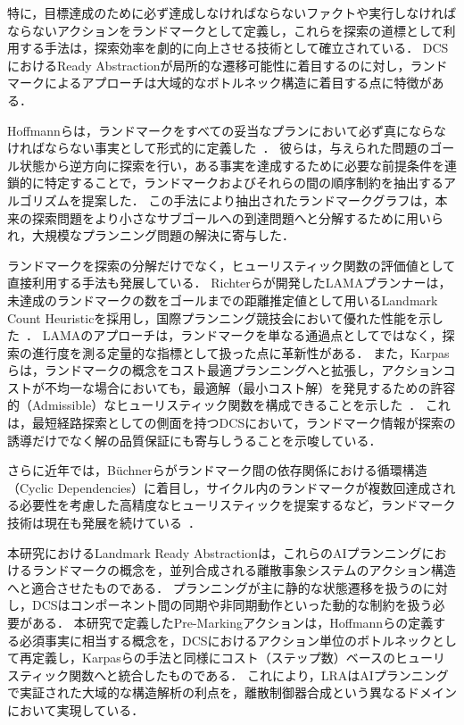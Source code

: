 \documentclass[a4paper,11pt,oneside,openany,report,dvipdfmx]{jsbook}
\begin{document}
特に，目標達成のために必ず達成しなければならないファクトや実行しなければならないアクションをランドマークとして定義し，これらを探索の道標として利用する手法は，探索効率を劇的に向上させる技術として確立されている．
DCSにおけるReady Abstractionが局所的な遷移可能性に着目するのに対し，ランドマークによるアプローチは大域的なボトルネック構造に着目する点に特徴がある．

Hoffmannらは，ランドマークをすべての妥当なプランにおいて必ず真にならなければならない事実として形式的に定義した~\cite{LandmarksInPlanning}．
彼らは，与えられた問題のゴール状態から逆方向に探索を行い，ある事実を達成するために必要な前提条件を連鎖的に特定することで，ランドマークおよびそれらの間の順序制約を抽出するアルゴリズムを提案した．
この手法により抽出されたランドマークグラフは，本来の探索問題をより小さなサブゴールへの到達問題へと分解するために用いられ，大規模なプランニング問題の解決に寄与した．

ランドマークを探索の分解だけでなく，ヒューリスティック関数の評価値として直接利用する手法も発展している．
Richterらが開発したLAMAプランナーは，未達成のランドマークの数をゴールまでの距離推定値として用いるLandmark Count Heuristicを採用し，国際プランニング競技会において優れた性能を示した~\cite{LAMAPlanner}．
LAMAのアプローチは，ランドマークを単なる通過点としてではなく，探索の進行度を測る定量的な指標として扱った点に革新性がある．
また，Karpasらは，ランドマークの概念をコスト最適プランニングへと拡張し，アクションコストが不均一な場合においても，最適解（最小コスト解）を発見するための許容的（Admissible）なヒューリスティック関数を構成できることを示した~\cite{CostOptimalPlanningWithLandmarks}．
これは，最短経路探索としての側面を持つDCSにおいて，ランドマーク情報が探索の誘導だけでなく解の品質保証にも寄与しうることを示唆している．

さらに近年では，Büchnerらがランドマーク間の依存関係における循環構造（Cyclic Dependencies）に着目し，サイクル内のランドマークが複数回達成される必要性を考慮した高精度なヒューリスティックを提案するなど，ランドマーク技術は現在も発展を続けている~\cite{CyclicLandmarkHeuristic}．

本研究におけるLandmark Ready Abstractionは，これらのAIプランニングにおけるランドマークの概念を，並列合成される離散事象システムのアクション構造へと適合させたものである．
プランニングが主に静的な状態遷移を扱うのに対し，DCSはコンポーネント間の同期や非同期動作といった動的な制約を扱う必要がある．
本研究で定義したPre-Markingアクションは，Hoffmannらの定義する必須事実に相当する概念を，DCSにおけるアクション単位のボトルネックとして再定義し，Karpasらの手法と同様にコスト（ステップ数）ベースのヒューリスティック関数へと統合したものである．
これにより，LRAはAIプランニングで実証された大域的な構造解析の利点を，離散制御器合成という異なるドメインにおいて実現している．
\end{document}
